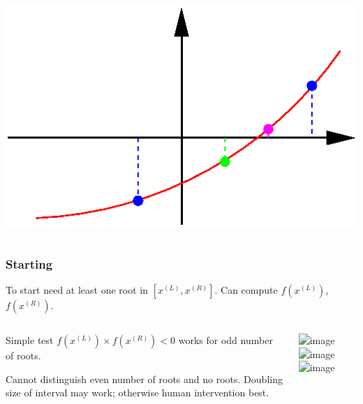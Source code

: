 \documentclass{beamer}
\begin{document}
\begin{frame}
\begin{columns}
\begin{column}{0.475\textwidth}
\begin{overlayarea}{\textwidth}{0.5\textheight}
{\begin{center}
            \includegraphics[width=\textwidth]{figures/Bisection3}
          \end{center}
        }
      \end{overlayarea}
    \end{column}
  \end{columns}

\end{frame}

\begin{frame}
  \frametitle{Starting}

  To start need at least one root in $[x^{(L)}, x^{(R)}]$. Can compute $f(x^{(L)})$, $f(x^{(R)})$. \pause

  \begin{columns}
    \begin{column}{0.5\textwidth}
      Simple test
        $f(x^{(L)}) \times f(x^{(R)}) < 0$
      works for odd number of roots. \pause

      \vspace{0.5ex}

      Cannot distinguish even number of roots and no
      roots. \pause Doubling size of interval
      may work; otherwise human intervention best.
    \end{column}
    \begin{column}{0.5\textwidth}
      \includegraphics<2|handout:0>[width=\textwidth]{figures/BisectionStart1}
      \includegraphics<3|handout:1>[width=\textwidth]{figures/BisectionStart2}
      \includegraphics<4|handout:2>[width=\textwidth]{figures/BisectionStart3}
    \end{column}
  \end{columns}

\end{frame}
\end{document}
